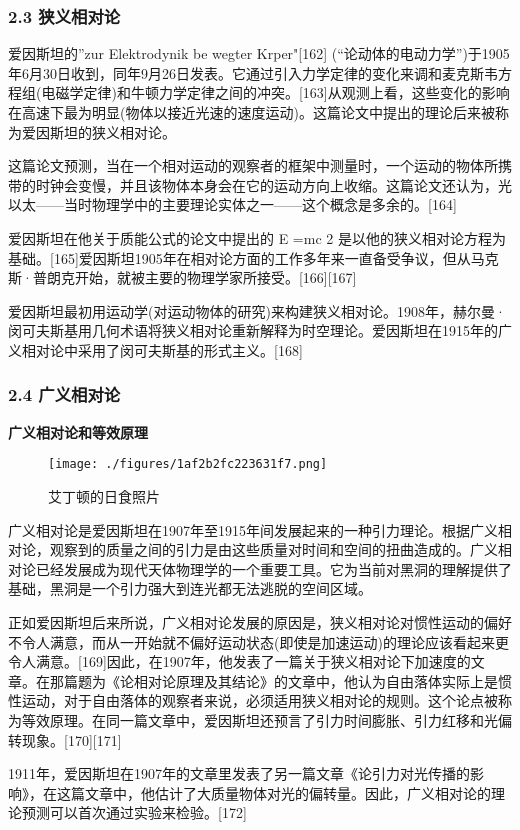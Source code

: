 \subsubsection{2.3 狭义相对论}
爱因斯坦的”zur Elektrodynik be wegter Krper"[162] (“论动体的电动力学”)于1905年6月30日收到，同年9月26日发表。它通过引入力学定律的变化来调和麦克斯韦方程组(电磁学定律)和牛顿力学定律之间的冲突。[163]从观测上看，这些变化的影响在高速下最为明显(物体以接近光速的速度运动)。这篇论文中提出的理论后来被称为爱因斯坦的狭义相对论。

这篇论文预测，当在一个相对运动的观察者的框架中测量时，一个运动的物体所携带的时钟会变慢，并且该物体本身会在它的运动方向上收缩。这篇论文还认为，光以太——当时物理学中的主要理论实体之一——这个概念是多余的。[164]

爱因斯坦在他关于质能公式的论文中提出的 E =mc 2 是以他的狭义相对论方程为基础。[165]爱因斯坦1905年在相对论方面的工作多年来一直备受争议，但从马克斯·普朗克开始，就被主要的物理学家所接受。[166][167]

爱因斯坦最初用运动学(对运动物体的研究)来构建狭义相对论。1908年，赫尔曼·闵可夫斯基用几何术语将狭义相对论重新解释为时空理论。爱因斯坦在1915年的广义相对论中采用了闵可夫斯基的形式主义。[168]

\subsubsection{2.4 广义相对论}
\textbf{广义相对论和等效原理}
\begin{figure}[ht]
\centering
\texttt{[image: ./figures/1af2b2fc223631f7.png]}
\caption{艾丁顿的日食照片} \label{fig_AYST_17}
\end{figure}
广义相对论是爱因斯坦在1907年至1915年间发展起来的一种引力理论。根据广义相对论，观察到的质量之间的引力是由这些质量对时间和空间的扭曲造成的。广义相对论已经发展成为现代天体物理学的一个重要工具。它为当前对黑洞的理解提供了基础，黑洞是一个引力强大到连光都无法逃脱的空间区域。

正如爱因斯坦后来所说，广义相对论发展的原因是，狭义相对论对惯性运动的偏好不令人满意，而从一开始就不偏好运动状态(即使是加速运动)的理论应该看起来更令人满意。[169]因此，在1907年，他发表了一篇关于狭义相对论下加速度的文章。在那篇题为《论相对论原理及其结论》的文章中，他认为自由落体实际上是惯性运动，对于自由落体的观察者来说，必须适用狭义相对论的规则。这个论点被称为等效原理。在同一篇文章中，爱因斯坦还预言了引力时间膨胀、引力红移和光偏转现象。[170][171]

1911年，爱因斯坦在1907年的文章里发表了另一篇文章《论引力对光传播的影响》，在这篇文章中，他估计了大质量物体对光的偏转量。因此，广义相对论的理论预测可以首次通过实验来检验。[172]

